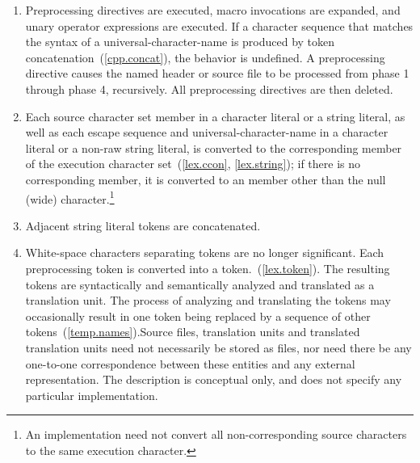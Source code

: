 \begin{enumerate}
\item Preprocessing directives are executed, macro invocations are
expanded, and  unary operator expressions are executed.
If a character sequence that matches the syntax of a
universal-character-name is produced by token
concatenation~(\ref{cpp.concat}), the behavior is undefined. A
 preprocessing directive causes the named header or
source file to be processed from phase 1 through phase 4, recursively.
All preprocessing directives are then deleted.

\item Each source character set member in a character literal or a string
literal, as well as each escape sequence and universal-character-name in a
character literal or a non-raw string literal, is converted to the corresponding
member of the execution character set~(\ref{lex.ccon}, \ref{lex.string}); if
there is no corresponding member, it is converted to an  member other
than the null (wide) character.\footnote{An implementation need not convert all
non-corresponding source characters to the same execution character.}

\item Adjacent string literal tokens are concatenated.

\item White-space characters separating tokens are no longer
significant. Each preprocessing token is converted into a
token.~(\ref{lex.token}). The resulting tokens are syntactically and
semantically analyzed and translated as a translation unit. \enternote
The process of analyzing and translating the tokens may occasionally
result in one token being replaced by a sequence of other
tokens~(\ref{temp.names}).\exitnote \enternote Source files, translation
units and translated translation units need not necessarily be stored as
files, nor need there be any one-to-one correspondence between these
entities and any external representation. The description is conceptual
only, and does not specify any particular implementation. \exitnote


\end{enumerate}
